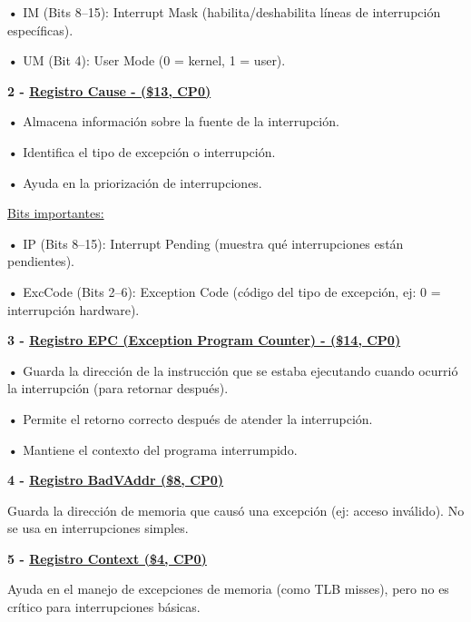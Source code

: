 \documentclass{article}
\begin{document}
\textbf{    •} { IM (Bits 8–15): Interrupt Mask (habilita/deshabilita líneas de interrupción específicas).}

\textbf{    •} { UM (Bit 4): User Mode (0 = kernel, 1 = user).}



\quad

\textbf{{2 -  } {\underline{Registro Cause - (\$13, CP0)}}}

\quad

\textbf{    •} { Almacena información sobre la fuente de la interrupción.}

\textbf{    •} { Identifica el tipo de excepción o interrupción.}

\textbf{    •} { Ayuda en la priorización de interrupciones.}

\quad

\underline{Bits importantes: }

\quad

\textbf{    •} { IP (Bits 8–15): Interrupt Pending (muestra qué interrupciones están pendientes).}

\textbf{    •} { ExcCode (Bits 2–6): Exception Code (código del tipo de excepción, ej: 0 = interrupción hardware).}

\quad

\textbf{{3 -  } {\underline{Registro EPC (Exception Program Counter) - (\$14, CP0)}}}

\quad

\textbf{    •} { Guarda la dirección de la instrucción que se estaba ejecutando cuando ocurrió la interrupción (para retornar después).}

\textbf{    •} { Permite el retorno correcto después de atender la interrupción.}

\textbf{    •} { Mantiene el contexto del programa interrumpido.}

\quad

\textbf{{4 -  } {\underline{Registro BadVAddr (\$8, CP0)}}}

\quad

{Guarda la dirección de memoria que causó una excepción (ej: acceso inválido). No se usa en interrupciones simples.}

\quad

\textbf{{5 -  } {\underline{Registro Context (\$4, CP0)}}}

\quad

{Ayuda en el manejo de excepciones de memoria (como TLB misses), pero no es crítico para interrupciones básicas.}
\end{document}
